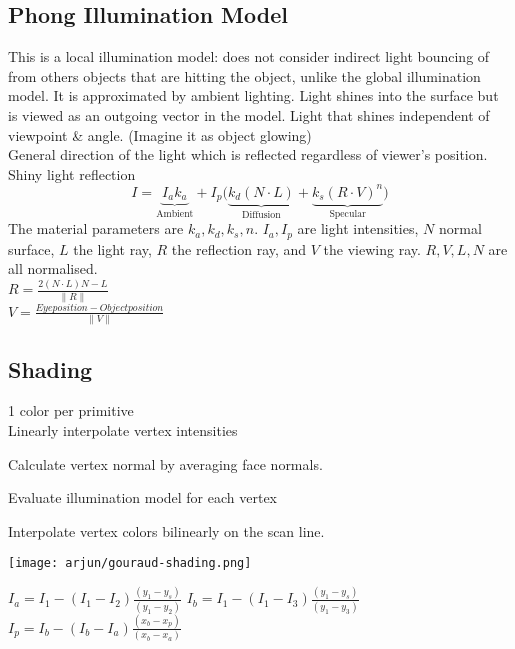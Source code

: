 \subsection*{Phong Illumination Model}
This is a local illumination model: does not consider indirect light bouncing of from others objects that are hitting the object, unlike the global illumination model. It is approximated by ambient lighting.
Light shines into the surface but is viewed as an outgoing vector in the model.
 Light that shines independent of viewpoint \& angle. (Imagine it as object glowing) \\
 General direction of the light which is reflected regardless of viewer's position.\\
 Shiny light reflection
$$I = \underbrace{I_ak_a }_\text{Ambient} + I_p \bigl( \underbrace{k_d(N \cdot L)}_\text{Diffusion} + \underbrace{k_s(R \cdot V)^n}_\text{Specular} \bigr)$$
The material parameters are $k_a, k_d, k_s, n$. $I_a, I_p$ are light intensities, $N$ normal surface, $L$ the light ray, $R$ the reflection ray, and $V$ the viewing ray. $R, V, L, N$ are all normalised. \\
$R = \frac{2(N \cdot L)N - L}{\lVert R \rVert} $ \\
$V = \frac{Eye position - Object position}{\lVert V \rVert} $
\subsection*{Shading}
 1 color per primitive \\
 Linearly interpolate vertex intensities
\begin{compactenum}
    \item Calculate vertex normal by averaging face normals.
    \item Evaluate illumination model for each vertex
    \item Interpolate vertex colors bilinearly on the scan line.
\end{compactenum}
\begin{center}
    \texttt{[image: arjun/gouraud-shading.png]}
\end{center}

$I_a = I_1 - (I_1 - I_2)\frac{(y_1-y_s)}{(y_1 - y_2)}$  
$I_b = I_1 - \left(I_1 - I_3\right) \frac{\left(y_1 - y_s\right)}{\left(y_1 - y_3\right)}$ 
$I_p = I_b - \left(I_b - I_a\right) \frac{\left(x_b - x_p\right)}{\left(x_b - x_a\right)}
$

